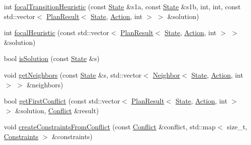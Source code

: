\begin{DoxyCompactItemize}
\item 
int \hyperlink{classlib_multi_robot_planning_1_1_environment_adf9e6ca87f829fd0fdc185d85b29bb4e}{focal\+Transition\+Heuristic} (const \hyperlink{structlib_multi_robot_planning_1_1_state}{State} \&s1a, const \hyperlink{structlib_multi_robot_planning_1_1_state}{State} \&s1b, int, int, const std\+::vector$<$ \hyperlink{structlib_multi_robot_planning_1_1_plan_result}{Plan\+Result}$<$ \hyperlink{structlib_multi_robot_planning_1_1_state}{State}, \hyperlink{namespacelib_multi_robot_planning_aba73fb71693f86a324adfa0e41e1053d}{Action}, int $>$ $>$ \&solution)
\item 
int \hyperlink{classlib_multi_robot_planning_1_1_environment_a7854e1df446e52051492b724c0416956}{focal\+Heuristic} (const std\+::vector$<$ \hyperlink{structlib_multi_robot_planning_1_1_plan_result}{Plan\+Result}$<$ \hyperlink{structlib_multi_robot_planning_1_1_state}{State}, \hyperlink{namespacelib_multi_robot_planning_aba73fb71693f86a324adfa0e41e1053d}{Action}, int $>$ $>$ \&solution)
\item 
bool \hyperlink{classlib_multi_robot_planning_1_1_environment_a397c066a4202f0dccbb1346e2e3c8338}{is\+Solution} (const \hyperlink{structlib_multi_robot_planning_1_1_state}{State} \&s)
\item 
void \hyperlink{classlib_multi_robot_planning_1_1_environment_ad0f11d7a4b91ea3d7f7fa39b9ffe9758}{get\+Neighbors} (const \hyperlink{structlib_multi_robot_planning_1_1_state}{State} \&s, std\+::vector$<$ \hyperlink{structlib_multi_robot_planning_1_1_neighbor}{Neighbor}$<$ \hyperlink{structlib_multi_robot_planning_1_1_state}{State}, \hyperlink{namespacelib_multi_robot_planning_aba73fb71693f86a324adfa0e41e1053d}{Action}, int $>$ $>$ \&neighbors)
\item 
bool \hyperlink{classlib_multi_robot_planning_1_1_environment_a1d47448bd35c1f46f70c6b7fa37e8146}{get\+First\+Conflict} (const std\+::vector$<$ \hyperlink{structlib_multi_robot_planning_1_1_plan_result}{Plan\+Result}$<$ \hyperlink{structlib_multi_robot_planning_1_1_state}{State}, \hyperlink{namespacelib_multi_robot_planning_aba73fb71693f86a324adfa0e41e1053d}{Action}, int $>$ $>$ \&solution, \hyperlink{structlib_multi_robot_planning_1_1_conflict}{Conflict} \&result)
\item 
void \hyperlink{classlib_multi_robot_planning_1_1_environment_a34aca235da8a5a1389ec71507c4191af}{create\+Constraints\+From\+Conflict} (const \hyperlink{structlib_multi_robot_planning_1_1_conflict}{Conflict} \&conflict, std\+::map$<$ size\+\_\+t, \hyperlink{structlib_multi_robot_planning_1_1_constraints}{Constraints} $>$ \&constraints)

\end{DoxyCompactItemize}
